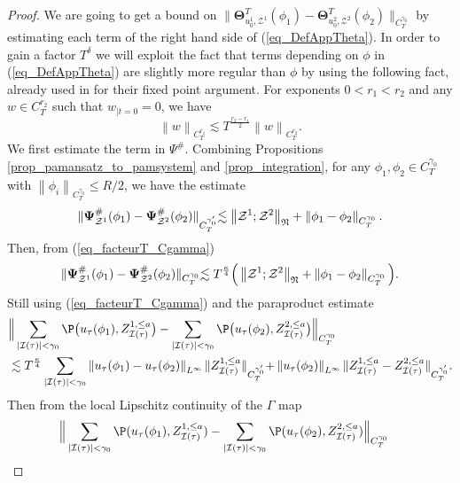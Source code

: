 \documentclass[11pt]{preprint}
\newcommand{\mcI}{\mathcal{I}}
\newcommand{\mcZ}{\mathcal{Z}}
\def\eqref#1{(\ref{#1})}
\newcommand{\norme}[1]{\left\lVert #1 \right\lVert}
\begin{document}
\begin{proof}
			We are going to get a bound on $\lVert\boldsymbol{\Theta}_{u_0^1,\mcZ^1}^T(\phi_1) -\boldsymbol{\Theta}_{u_0^2,\mcZ^2}^T(\phi_2) \lVert_{C^{\gamma_0}_T}$ by estimating each term of the right hand side of \eqref{eq_DefAppTheta}. In order to gain a factor $T^\delta$ we will exploit the fact that terms depending on $\phi$ in \eqref{eq_DefAppTheta} are slightly more regular than $\phi$ by using the following fact, already used in \cite{BailleulBernicotHighOrder} for their fixed point argument. For exponents $0<r_1<r_2$ and any $w\in C^{r_2}_T$ such that $w_{|t=0} = 0$, we have
			\begin{equation}\label{eq_facteurT_Cgamma}
				\norme{w}_{C^{r_1}_T} \lesssim T^{\frac{r_2-r_1}{2}} \norme{w}_{C^{r_2}_T}.
			\end{equation}
			We first estimate the term in $\Psi^\#$. Combining Propositions \ref{prop_pamansatz_to_pamsystem} and \ref{prop_integration}, for any $\phi_1,\phi_2 \in C^{\gamma_0}_T$ with $\norme{\phi_i}_{C_T^{\gamma_0}} \leq R/2$, we have the estimate
			\begin{align*}
				\lVert \boldsymbol{\Psi}^\#_{\mcZ^1}(\phi_1) - \boldsymbol{\Psi}^\#_{\mcZ^2}(\phi_2) \lVert_{C_T^{\gamma'_0}} \lesssim \norme{\mcZ^1;\mcZ^2}_{\frak{N}} + \norme{\phi_1 - \phi_2}_{C_T^{\gamma_0}}.
			\end{align*}
			Then, from \eqref{eq_facteurT_Cgamma}  
			$$
				\lVert \boldsymbol{\Psi}^\#_{\mcZ^1}(\phi_1) - \boldsymbol{\Psi}^\#_{\mcZ^2}(\phi_2) \lVert_{C_T^{\gamma_0}} 
				\lesssim 
				T^{\frac{\kappa}{4}}\Big(\norme{\mcZ^1;\mcZ^2}_{\frak{N}} + \norme{\phi_1 - \phi_2}_{C_T^{\gamma_0}}\Big).
			$$			
Still using \eqref{eq_facteurT_Cgamma} and the paraproduct estimate
\begin{align*}
	&\Big\lVert \sum_{|\mcI(\tau)|<\gamma_0} \P\big(u_\tau(\phi_1),Z_{\mcI(\tau)}^{1,\leq a}\big)- \sum_{|\mcI(\tau)|<\gamma_0} \P\big(u_\tau(\phi_2),Z_{\mcI(\tau)}^{2,\leq a}\big)\Big\lVert_{C^{\gamma_0}_T}
	\\
	&\lesssim  	T^{\frac{\kappa}{4}}  \sum_{|\mcI(\tau)|<\gamma_0} \norme{u_\tau(\phi_1) - u_\tau(\phi_2)}_{L^\infty} \lVert Z_{\mcI(\tau)}^{1,\leq a}\lVert_{C^{\gamma'_0}_T} + \norme{u_\tau(\phi_2)}_{L^\infty} \lVert Z_{\mcI(\tau)}^{1,\leq a} - Z_{\mcI(\tau)}^{2,\leq a} \lVert_{C^{\gamma'_0}_T}.
\end{align*}
Then from the local Lipschitz continuity of the $\Gamma$ map
\begin{align*}
	&\Big\lVert \sum_{|\mcI(\tau)|<\gamma_0} \P(u_\tau(\phi_1),Z_{\mcI(\tau)}^{1,\leq a})- \sum_{|\mcI(\tau)|<\gamma_0} \P(u_\tau(\phi_2),Z_{\mcI(\tau)}^{2,\leq a})\Big\lVert_{C^{\gamma_0}_T}

\end{align*}
\end{proof}
\end{document}
